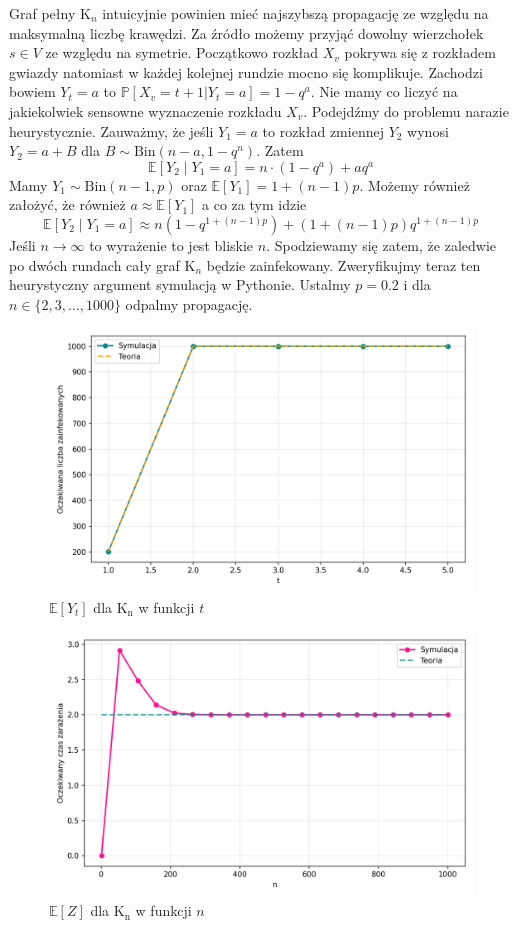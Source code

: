 Graf pełny $\mathrm{K}_n$ intuicyjnie powinien mieć najszybszą propagację ze względu na maksymalną liczbę krawędzi. Za źródło możemy przyjąć dowolny wierzchołek $s\in V$ ze względu na symetrie. Początkowo rozkład $X_v$ pokrywa się z rozkładem gwiazdy natomiast w każdej kolejnej rundzie mocno się komplikuje. Zachodzi bowiem $Y_t=a$ to $\mathbb{P}[X_v = t+1 | Y_t = a] = 1 - q^a$. Nie mamy co liczyć na jakiekolwiek sensowne wyznaczenie rozkładu $X_v$. Podejdźmy do problemu narazie heurystycznie. Zauważmy, że jeśli $Y_1=a$ to rozkład zmiennej $Y_2$ wynosi $Y_2 = a + B$ dla $B \sim \mathrm{Bin}(n-a, 1-q^n)$. Zatem 
\[
    \mathbb{E}[Y_2\mid Y_1 = a] = n\cdot (1-q^a) + aq^a
\]
Mamy $Y_1\sim \mathrm{Bin}(n-1,p)$ oraz $\mathbb{E}[Y_1]=1+(n-1)p$. Możemy również założyć, że również $a \approx \mathbb{E}[Y_1]$ a co za tym idzie 
\[
    \mathbb{E}[Y_2\mid Y_1 = a] \approx n(1-q^{1+(n-1)p})+(1+(n-1)p)q^{1+(n-1)p} 
\]
Jeśli $n\to\infty$ to wyrażenie to jest bliskie $n$. Spodziewamy się zatem, że zaledwie po dwóch rundach cały graf $\mathrm{K}_n$ będzie zainfekowany. Zweryfikujmy teraz ten heurystyczny argument symulacją w Pythonie. Ustalmy $p=0.2$ i dla $n\in\{2,3,\dots,1000\}$ odpalmy propagację. 
\begin{figure}[!ht]
    \centering
    \includegraphics[width=1\textwidth]{../img/complete/final_infection_expectations.png}
    \caption{$\mathbb{E}[Y_t]$ dla $\mathrm{K_n}$ w funkcji $t$}
\end{figure}
\begin{figure}[!ht]
    \centering
    \includegraphics[width=1\textwidth]{../img/complete/full_infection_expectation.png}
    \caption{$\mathbb{E}[Z]$ dla $\mathrm{K_n}$ w funkcji $n$}
\end{figure}
